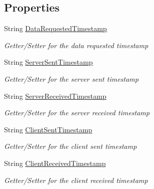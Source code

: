 \subsection*{Properties}
\begin{DoxyCompactItemize}
\item 
String \hyperlink{class_web_analyzer_1_1_models_1_1_base_1_1_basic_data_a9f11a4f0d9a836f2306752c698b19856}{Data\+Requested\+Timestamp}
\begin{DoxyCompactList}\small\item\em Getter/\+Setter for the data requested timestamp \end{DoxyCompactList}\item 
String \hyperlink{class_web_analyzer_1_1_models_1_1_base_1_1_basic_data_af2791f5084f56826a6d6987e3a939c94}{Server\+Sent\+Timestamp}
\begin{DoxyCompactList}\small\item\em Getter/\+Setter for the server sent timestamp \end{DoxyCompactList}\item 
String \hyperlink{class_web_analyzer_1_1_models_1_1_base_1_1_basic_data_ad2317294c8861a75447de02e23886999}{Server\+Received\+Timestamp}
\begin{DoxyCompactList}\small\item\em Getter/\+Setter for the server received timestamp \end{DoxyCompactList}\item 
String \hyperlink{class_web_analyzer_1_1_models_1_1_base_1_1_basic_data_a11512dbd875ce0164533581496aa2590}{Client\+Sent\+Timestamp}
\begin{DoxyCompactList}\small\item\em Getter/\+Setter for the client sent timestamp \end{DoxyCompactList}\item 
String \hyperlink{class_web_analyzer_1_1_models_1_1_base_1_1_basic_data_a8b0171225716326d83b7c57d67b3213d}{Client\+Received\+Timestamp}
\begin{DoxyCompactList}\small\item\em Getter/\+Setter for the client received timestamp \end{DoxyCompactList}\end{DoxyCompactItemize}


